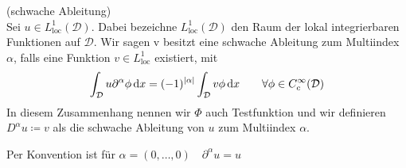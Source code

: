 \begin{Definition}(schwache Ableitung)\\
	Sei $u \in L_{\text{loc}}^1(\mathcal{D})$. Dabei bezeichne $  L_{\text{loc}}^1(\mathcal{D}) $ den Raum der lokal integrierbaren Funktionen auf $ \mathcal{D} $. Wir sagen v besitzt eine schwache Ableitung zum Multiindex $\alpha$, falls eine Funktion $v \in L_{\text{loc}}^1$ existiert, mit 
		\begin{align*}
			\int_{\mathcal{D}} u \partial^{\alpha} \phi \, \mathrm{d} x = (-1)^{|\alpha|} \int_{\mathcal{D}} v \phi \, \mathrm{d} x \qquad \forall \phi \in C_c^{\infty}(\mathcal{D})
		\end{align*}
	In diesem Zusammenhang nennen wir $\Phi$ auch Testfunktion und wir definieren $D^{\alpha} u \coloneqq v$ als die schwache Ableitung von $u$ zum Multiindex $\alpha$. 
\end{Definition}
\begin{Bemerkung}
	Per Konvention ist für $ \alpha = (0,\dots, 0) \quad \partial^{\alpha}u = u $
\end{Bemerkung}
